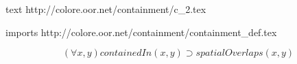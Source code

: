 text http://colore.oor.net/containment/c_2.tex

imports http://colore.oor.net/containment/containment_def.tex

\begin{equation}
(\forall x,y) containedIn(x,y) \supset spatialOverlaps(x,y)
\end{equation}
